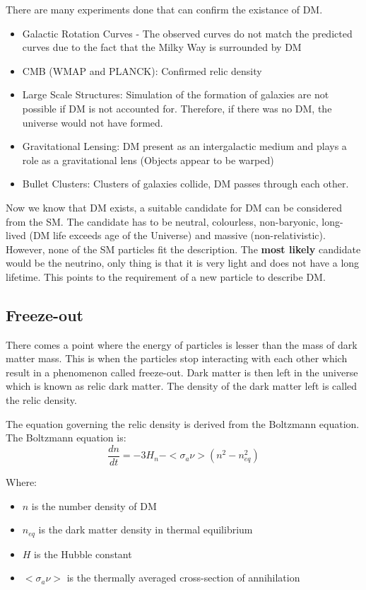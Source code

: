 \documentclass[11pt,a4paper]{article}
\begin{document}
There are many experiments done that can confirm the existance of DM.

\begin{itemize}
    \item Galactic Rotation Curves - The observed curves do not match the predicted curves due to the fact that the Milky Way is surrounded by DM
    \item CMB (WMAP and PLANCK): Confirmed relic density
    \item Large Scale Structures: Simulation of the formation of galaxies are not possible if DM is not accounted for. Therefore, if there was no DM, the universe would not have formed.
    \item Gravitational Lensing: DM present as an intergalactic medium and plays a role as a gravitational lens (Objects appear to be warped)
    \item Bullet Clusters: Clusters of galaxies collide, DM passes through each other.
\end{itemize}

Now we know that DM exists, a suitable candidate for DM can be considered from the SM. The candidate has to be neutral, colourless, non-baryonic, long-lived (DM life exceeds age of the Universe) and massive (non-relativistic). However, none of the SM particles fit the description. The \textbf{most likely} candidate would be the neutrino, only thing is that it is very light and does not have a long lifetime. This points to the requirement of a new particle to describe DM.

\subsection{Freeze-out}
There comes a point where the energy of particles is lesser than the mass of dark matter mass. This is when the particles stop interacting with each other which result in a phenomenon called freeze-out. Dark matter is then left in the universe which is known as relic dark matter. The density of the dark matter left is called the relic density.

The equation governing the relic density is derived from the Boltzmann equation. The Boltzmann equation is:
\begin{equation}
    \frac{dn}{dt} = -3H_n - <\sigma_a \nu>(n^2 - n^2_{eq})
\end{equation}

Where:
\begin{itemize}
    \item $n$ is the number density of DM
    \item $n_{eq}$ is the dark matter density in thermal equilibrium 
    \item $H$ is the Hubble constant
    \item $<\sigma_a \nu>$ is the thermally averaged cross-section of annihilation
\end{itemize}
\end{document}
